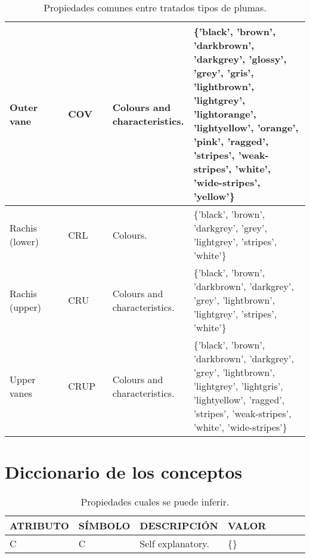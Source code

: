\documentclass[a4paper,12pt]{article}
\begin{document}
\begin{table}[H]
\begin{tabular}{|p{0.2\linewidth}|p{0.15\linewidth}|p{0.25\linewidth}|p{0.45\linewidth}|}
		Outer vane     & COV     & Colours and characteristics.                             & \{'black', 'brown', 'darkbrown', 'darkgrey', 'glossy', 'grey', 'gris', 'lightbrown', 'lightgrey', 'lightorange', 'lightyellow', 'orange', 'pink', 'ragged', 'stripes', 'weak-stripes', 'white', 'wide-stripes', 'yellow'\} \\ \hline
		Rachis (lower) & CRL     & Colours.                             & \{'black', 'brown', 'darkgrey', 'grey', 'lightgrey', 'stripes', 'white'\}                                                                                     \\ \hline
		Rachis (upper) & CRU     & Colours and characteristics.                             & \{'black', 'brown', 'darkbrown', 'darkgrey', 'grey', 'lightbrown', 'lightgrey', 'stripes', 'white'\}                                                                         \\ \hline
		Upper vanes    & CRUP    & Colours and characteristics.                             & \{'black', 'brown', 'darkbrown', 'darkgrey', 'grey', 'lightbrown', 'lightgrey', 'lightgris', 'lightyellow', 'ragged', 'stripes', 'weak-stripes', 'white', 'wide-stripes'\}                                                    \\ \hline
	\end{tabular}
	\caption{Propiedades comunes entre tratados tipos de plumas.}
\end{table}

\section{Diccionario de los conceptos}
\begin{table}[H]
	\centering
	\begin{tabular}{|p{0.2\linewidth}|p{0.15\linewidth}|p{0.25\linewidth}|p{0.4\linewidth}|}
		\hline
		ATRIBUTO & SÍMBOLO & DESCRIPCIÓN       & VALOR \\ \hline\hline
		C        & C       & Self explanatory. & \{\}  \\ \hline
	\end{tabular}
\caption{Propiedades cuales se puede inferir.}
\end{table}
\end{document}
